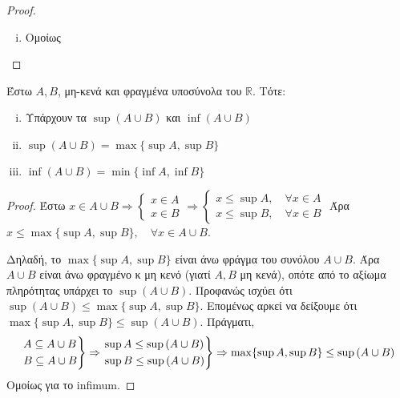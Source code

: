 \begin{proof}
\begin{enumerate}[(i)]
    \item Ομοίως
  \end{enumerate}
\end{proof}

\begin{mybox3}
\begin{prop}
  Έστω $ A, B $, μη-κενά και φραγμένα υποσύνολα του $ \mathbb{R} $. Τότε: 
  \begin{enumerate}[i)]
    \item Υπάρχουν τα $ \sup {(A \cup B)} $ και $ \inf {(A \cup B)} $
    \item $ \sup {(A \cup B)} = \max \{ \sup A, \sup B \} $
    \item $ \inf {(A \cup B)} = \min \{ \inf A, \inf B \} $
  \end{enumerate}
\end{prop}
\end{mybox3}
\begin{proof}
\item {}
  Έστω $ x \in A \cup B \Rightarrow 
  \begin{cases} 
    x \in A  \\
    x \in B  
  \end{cases} \Rightarrow 
  \begin{cases} 
    x \leq \sup A, \quad \forall x \in A \\
    x \leq \sup B,  \quad \forall x \in B     
  \end{cases}
  $  
  Άρα $ x \leq \max \{ \sup A, \sup B \} , \quad \forall x \in A \cup B $.

  Δηλαδή, το $ \max \{ \sup A, \sup B \} $ είναι άνω φράγμα του συνόλου 
  $ A \cup B $. Άρα $ A \cup B $ είναι άνω φραγμένο κ μη κενό 
  (γιατί $A,B$ μη κενά), οπότε από το αξίωμα πληρότητας υπάρχει το 
  $ \sup {(A \cup B)} $. 
  Προφανώς ισχύει ότι $ \sup {(A \cup B)} \leq \max \{ \sup A, \sup B \} $.
  Επομένως αρκεί να δείξουμε ότι $ \max \{ \sup A, \sup B \} \leq \sup {(A \cup B)}
  $. Πράγματι, 
  \[
    \begin{rcases} 
      A \subseteq A \cup B \\
      B \subseteq A \cup B \\
    \end{rcases} \Rightarrow 
    \begin{rcases} 
      \sup A \leq \sup {(A \cup B)} \\
      \sup B \leq \sup {(A \cup B)} \\
    \end{rcases} \Rightarrow 
    \max \{ \sup A, \sup B \} \leq \sup {(A \cup B)}
  \] 
  Ομοίως για το infimum.
\end{proof}

